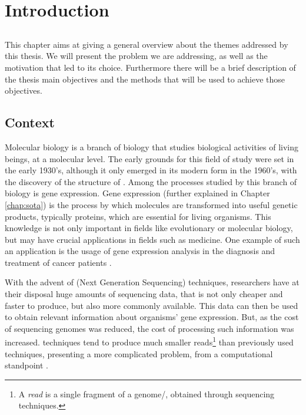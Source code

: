 \chapter{Introduction} \label{chap:intro}

\section*{}

This chapter aims at giving a general overview about the themes addressed by
this thesis. We will present the problem we are addressing, as well as the
motivation that led to its choice. Furthermore there will be a brief description
of the thesis main objectives and the methods that will be used to achieve those
objectives.

\section{Context} \label{sec:context}

Molecular biology is a branch of biology that studies biological activities of
living beings, at a molecular level. The early grounds for this field of study
were set in the early 1930's, although it only emerged in its modern form in the
1960's, with the discovery of the structure of \dna. Among the processes studied
by this branch of biology is gene expression. Gene expression (further explained
in Chapter \ref{chap:sota}) is the process by which \dna{} molecules are
transformed into useful genetic products, typically proteins, which are
essential for living organisms. This knowledge is not only important in fields
like evolutionary or molecular biology, but may have crucial applications in
fields such as medicine. One example of such an application is the usage of gene
expression analysis in the diagnosis and treatment of cancer patients
\cite{Pusztai01062003}.

With the advent of \ngs{} (Next Generation Sequencing) techniques, researchers
have at their disposal huge amounts of sequencing data, that is not only cheaper
and faster to produce, but also more commonly available. This data can then be
used to obtain relevant information about organisms' gene expression. But, as
the cost of sequencing genomes was reduced, the cost of processing such
information was increased. \ngs{} techniques tend to produce much smaller
reads\footnote{A \textit{read} is a single fragment of a genome/\trans, obtained
through sequencing techniques.} than previously used techniques, presenting a
more complicated problem, from a computational standpoint \cite{Wolf2013}.

